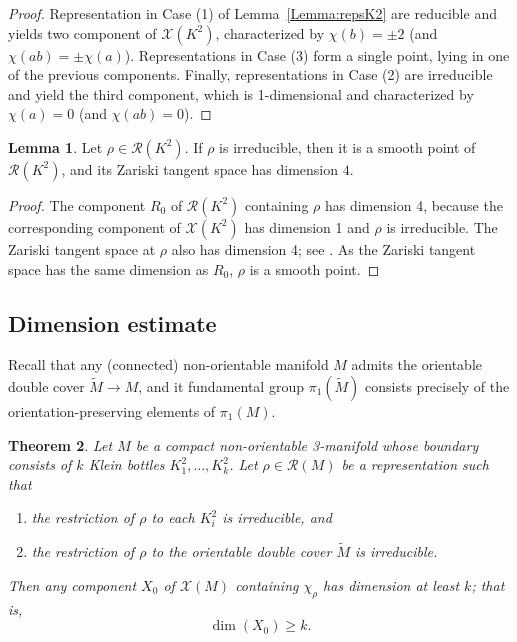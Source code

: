 \documentclass[12pt,reqno]{amsart}
\newtheorem{theorem}{Theorem}[section]
\theoremstyle{definition}
\newtheorem{lemma}[theorem]{Lemma}
\def\calR{\mathcal R}
\def\calX{\mathcal X}
\begin{document}
\begin{proof}
    Representation in Case (1) of Lemma~\ref{Lemma:repsK2} are reducible and yields two component of
    $\mathcal X( K^2)$, characterized by $\chi(b)=\pm 2$ 
    (and $\chi(ab)=\pm \chi(a)$). 
    Representations in Case (3) form a single point, 
    lying in one of the previous components.
    Finally, 
    representations in Case (2) are irreducible and yield 
    the third component, which is 1-dimensional and 
    characterized by $\chi(a)=0 $ (and $\chi(ab)=0$).
\end{proof}




\begin{lemma}
    \label{Lemma:K^2Smooth}
    Let $\rho\in \calR(K^2)$. If $\rho$ is irreducible, then it is a smooth point of $\calR(K^2)$, and its Zariski tangent space has dimension $4$.
\end{lemma}

\begin{proof}
    The component $R_0$ of $\calR(K^2)$ containing $\rho$  has dimension 4, because the corresponding component of $\calX(K^2)$ has dimension 1 and $\rho$ is irreducible. 
    The Zariski tangent space at $\rho$ also has dimension 4; see \cite[Proposition 4.1]{PortiDim}. As the Zariski tangent space has 
    the same dimension as $R_0$,  $\rho$ is a smooth point.
\end{proof}

\subsection{Dimension estimate}

Recall that any (connected) non-orientable manifold $M$ admits the orientable double cover
$\widetilde{M}\to M$, and it fundamental group $\pi_1(\widetilde{M})$
consists precisely of the orientation-preserving elements of $\pi_1(M)$. 

\begin{theorem}
    \label{Theorem:DimensionEstimate}
    Let $M$ be a compact non-orientable 3-manifold whose boundary consists of $k$ Klein bottles
    $K^2_1, \ldots, K^2_k$. Let  $\rho\in \calR(M)$ be
    a representation such that
    \begin{enumerate}
        \item[(a)] the restriction of $\rho$ to each $K^2_i$ is irreducible, and
        \item[(b)] the restriction of $\rho$ to the orientable double cover $\widetilde{M}$ 
        is irreducible.
    \end{enumerate}
    Then any component $X_0$ of $\mathcal X(M)$ containing 
    $\chi_\rho$ has dimension at least $k$; that is,
    $$\dim (X_0)\geq k.$$
\end{theorem}
\end{document}
